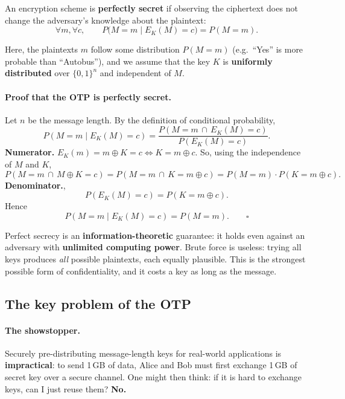\begin{definition}
An encryption scheme is \textbf{perfectly secret} if observing the ciphertext does not change the adversary's knowledge about the plaintext:
\[
\forall m, \forall c, \qquad P\big(M = m \mid E_K(M) = c\big) = P(M = m).
\]
\end{definition}

Here, the plaintexts $m$ follow some distribution $P(M = m)$ (e.g.\ ``Yes'' is more probable than ``Autobus''), and we assume that the key $K$ is \textbf{uniformly distributed} over $\{0,1\}^n$ and independent of $M$.

\paragraph{Proof that the OTP is perfectly secret.} Let $n$ be the message length. By the definition of conditional probability,
\[
P(M = m \mid E_K(M) = c) = \frac{P(M = m \,\cap\, E_K(M) = c)}{P(E_K(M) = c)}.
\]
\textbf{Numerator.} $E_K(m) = m \oplus K = c \iff K = m \oplus c$. So, using the independence of $M$ and $K$,
\[
P(M = m \,\cap\, M \oplus K = c) = P(M = m \,\cap\, K = m \oplus c) = P(M = m) \cdot P(K = m \oplus c).
\]
\textbf{Denominator.},
\[
P(E_K(M) = c) =  P(K = m \oplus c).
\]
Hence
\[
P(M = m \mid E_K(M) = c) = P(M = m). \qquad \square
\]

\begin{remark}
Perfect secrecy is an \textbf{information-theoretic} guarantee: it holds even against an adversary with \textbf{unlimited computing power}. Brute force is useless: trying all keys produces \emph{all} possible plaintexts, each equally plausible. This is the strongest possible form of confidentiality, and it costs a key as long as the message.
\end{remark}

\subsection{The key problem of the OTP}

\begin{center}
\end{center}

\paragraph{The showstopper.} Securely pre-distributing message-length keys for real-world applications is \textbf{impractical}: to send 1\,GB of data, Alice and Bob must first exchange 1\,GB of secret key over a secure channel. One might then think: if it is hard to exchange keys, can I just reuse them? \textbf{No.}

